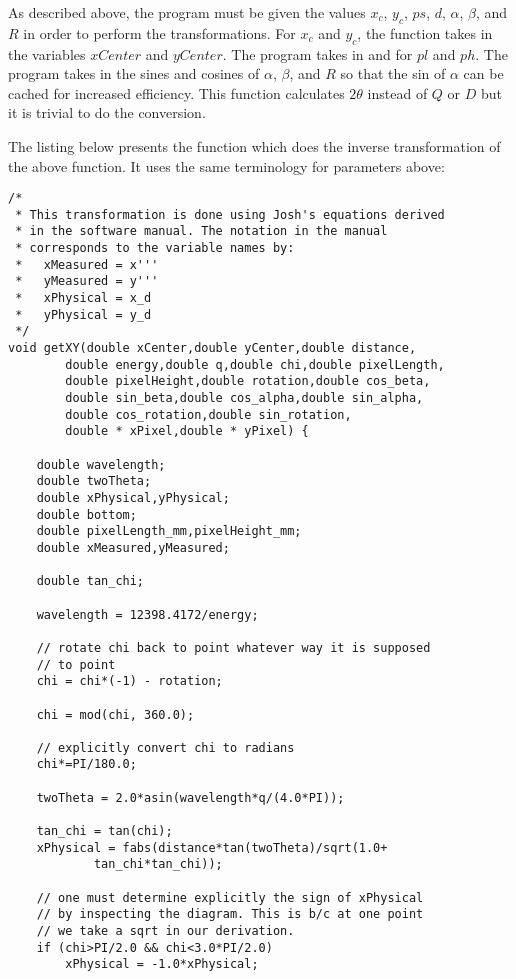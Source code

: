 As described above, the program must be given
the values $x_c$, $y_c$, $ps$, $d$, $\alpha$, 
$\beta$, and $R$ in order to perform the 
transformations.  
For $x_c$ and $y_c$, 
the function takes in the variables $xCenter$ and
$yCenter$. The program takes in  
and  for $pl$ and $ph$. The program 
takes in the sines and cosines of $\alpha$, $\beta$, and 
$R$ so that the sin of $\alpha$ can be cached for increased
efficiency. This function calculates $2\theta$ instead
of $Q$ or $D$ but it is trivial to do the conversion.

The listing below presents the function  
which does the inverse transformation of 
the above function. It uses the same
terminology for parameters above:
\begin{lstlisting}
/*
 * This transformation is done using Josh's equations derived
 * in the software manual. The notation in the manual 
 * corresponds to the variable names by:
 *   xMeasured = x'''
 *   yMeasured = y'''
 *   xPhysical = x_d
 *   yPhysical = y_d
 */
void getXY(double xCenter,double yCenter,double distance,
        double energy,double q,double chi,double pixelLength,
        double pixelHeight,double rotation,double cos_beta,
        double sin_beta,double cos_alpha,double sin_alpha,
        double cos_rotation,double sin_rotation,
        double * xPixel,double * yPixel) {

    double wavelength;
    double twoTheta;
    double xPhysical,yPhysical;
    double bottom;
    double pixelLength_mm,pixelHeight_mm;
    double xMeasured,yMeasured;

    double tan_chi;

    wavelength = 12398.4172/energy;

    // rotate chi back to point whatever way it is supposed 
    // to point
    chi = chi*(-1) - rotation;

    chi = mod(chi, 360.0);
    
    // explicitly convert chi to radians
    chi*=PI/180.0;

    twoTheta = 2.0*asin(wavelength*q/(4.0*PI));

    tan_chi = tan(chi);
    xPhysical = fabs(distance*tan(twoTheta)/sqrt(1.0+
            tan_chi*tan_chi));

    // one must determine explicitly the sign of xPhysical 
    // by inspecting the diagram. This is b/c at one point 
    // we take a sqrt in our derivation.
    if (chi>PI/2.0 && chi<3.0*PI/2.0) 
        xPhysical = -1.0*xPhysical;


\end{lstlisting}
